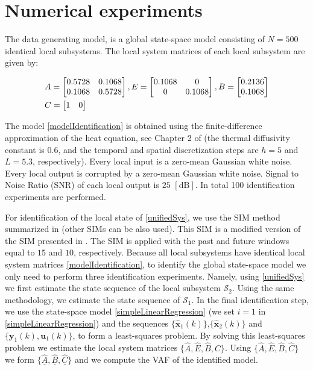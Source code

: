 \documentclass[journal,10pt]{IEEEtran}
\begin{document}
\section{Numerical experiments}
\label{numericalSection}
The data generating model, is a global state-space model consisting of $N=500$ identical local subsystems. The local system matrices of each local subsystem are given by:
\begin{small}
\begin{align}
& A=\begin{bmatrix} 0.5728  & 0.1068   \\
                   0.1068  &  0.5728\end{bmatrix}, E=\begin{bmatrix}       0.1068      & 0 \\
         0  &     0.1068  \end{bmatrix},
 B=\begin{bmatrix} 0.2136\\  0.1068 \end{bmatrix}\notag \\ & C=\begin{bmatrix} 1 & 0 \end{bmatrix}
\label{modelIdentification}
\end{align}
\end{small}
The model \eqref{modelIdentification} is obtained using the finite-difference approximation of the heat equation, see Chapter 2 of \cite{haberThesis} (the thermal diffusivity constant is $0.6$, and the temporal and spatial discretization steps are $h=5$ and $L=5.3$, respectively). Every local input is a zero-mean Gaussian white noise. Every local output is corrupted by a zero-mean Gaussian white noise. Signal to Noise Ratio (SNR) of each local output is $25$ $[\text{dB}]$. In total 100 identification experiments are performed.
\par
For identification of the local state of \eqref{unifiedSys}, we use the SIM method summarized in \cite{haber2} (other SIMs can be also used). This SIM is a modified version of the SIM presented in \cite{jansson2003}. The SIM is applied with the past and future windows equal to $15$ and $10$, respectively.  Because all local subsystems have identical local system matrices \eqref{modelIdentification}, to identify the global state-space model we only need to perform three identification experiments. Namely, using \eqref{unifiedSys} we first estimate the state sequence of the local subsystem $\mathcal{S}_{2}$. Using the same methodology, we estimate the state sequence of $\mathcal{S}_{1}$. In the final identification step, we use the state-space model \eqref{simpleLinearRegression} (we set $i=1$ in \eqref{simpleLinearRegression}) and the sequences $\{\hat{\mathbf{x}}_{1}(k)\}$,$\{\hat{\mathbf{x}}_{2}(k)\}$ and $\{\mathbf{y}_{1}(k),\mathbf{u}_{1}(k)\}$, to form a least-squares problem. By solving this least-squares problem we estimate the local system matrices $\{\hat{A},\hat{E},\hat{B},\hat{C} \}$. Using $\{\hat{A},\hat{E},\hat{B},\hat{C} \}$ we form  $\{\underline{\hat{A}},\underline{\hat{B}},\underline{\hat{C}}\}$ and we compute the VAF of the identified model. 
\end{document}
